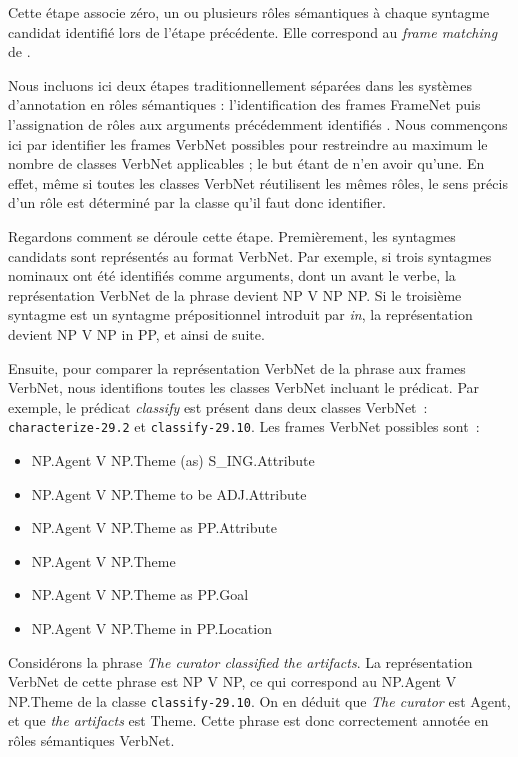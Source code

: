 Cette étape associe zéro, un ou plusieurs rôles sémantiques à chaque syntagme
candidat identifié lors de l'étape précédente. Elle correspond au \emph{frame
matching} de \citet{swier2005exploiting}.

Nous incluons ici deux étapes traditionnellement séparées dans les systèmes
d'annotation en rôles sémantiques : l'identification des frames FrameNet puis
l'assignation de rôles aux arguments précédemment identifiés
\citep{gildea2002automatic,das2014frame}. Nous commençons ici par identifier
les frames VerbNet possibles pour restreindre au maximum le nombre de classes
VerbNet applicables ; le but étant de n'en avoir qu'une. En effet, même si
toutes les classes VerbNet réutilisent les mêmes rôles, le sens précis d'un
rôle est déterminé par la classe qu'il faut donc identifier.

Regardons comment se déroule cette étape. Premièrement, les syntagmes candidats
sont représentés au format VerbNet. Par exemple, si trois syntagmes nominaux
ont été identifiés comme arguments, dont un avant le verbe, la représentation
VerbNet de la phrase devient NP V NP NP. Si le troisième syntagme est un
syntagme prépositionnel introduit par \textit{in}, la représentation devient NP
V NP in PP, et ainsi de suite.

Ensuite, pour comparer la représentation VerbNet de la phrase aux frames
VerbNet, nous identifions toutes les classes VerbNet incluant le prédicat. Par
exemple, le prédicat \emph{classify} est présent dans deux classes VerbNet~:
\texttt{characterize-29.2} et \texttt{classify-29.10}. Les frames VerbNet
possibles sont~:

\begin{itemize}
    \item NP.Agent V NP.Theme (as) S\_ING.Attribute
    \item NP.Agent V NP.Theme to be ADJ.Attribute
    \item NP.Agent V NP.Theme as PP.Attribute
    \item NP.Agent V NP.Theme
    \item NP.Agent V NP.Theme as PP.Goal
    \item NP.Agent V NP.Theme in PP.Location
\end{itemize}

Considérons la phrase \emph{The curator classified the artifacts}. La
représentation VerbNet de cette phrase est NP V NP, ce qui correspond au
NP.Agent V NP.Theme de la classe \texttt{classify-29.10}. On en déduit que
\emph{The curator} est Agent, et que \emph{the artifacts} est Theme. Cette
phrase est donc correctement annotée en rôles sémantiques VerbNet.

